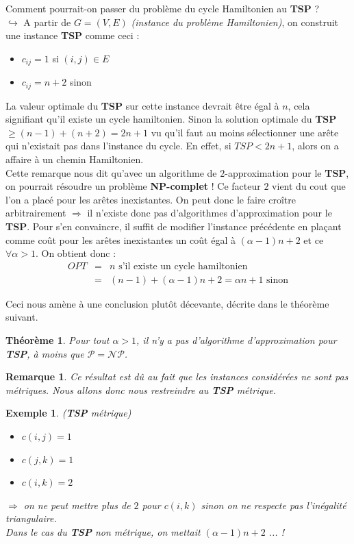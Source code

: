 \documentclass[12pt]{article}
\newcommand{\titre}[1]{\textcolor{title}{#1}}
\newtheorem{exemple}{Exemple}[section]
\newtheorem{rem}{Remarque}[section]
\newtheorem{thm}{Th\'eor\`eme}[section]
\begin{document}
Comment pourrait-on passer du problème du cycle Hamiltonien au \textbf{\titre{TSP}} ? \\
$\hookrightarrow$ A partir de $G=(V,E)$ \textit{(instance du problème Hamiltonien)}, on construit une instance \textbf{\titre{TSP}} comme
ceci :
\begin{itemize}
\item $c_{ij} = 1$ si $(i,j)\in E$
\item $c_{ij} = n+2$ sinon
\end{itemize}
La valeur optimale du \textbf{\titre{TSP}} sur cette instance devrait être égal à $n$, cela signifiant qu'il existe un cycle hamiltonien.
Sinon la solution optimale du \textbf{\titre{TSP}} $\geq (n-1)+(n+2) = 2n+1$ vu qu'il faut au moins sélectionner une arête qui n'existait
pas dans l'instance du cycle. En effet, si $TSP < 2n+1$, alors on a affaire à un
chemin Hamiltonien. \\

Cette remarque nous dit qu'avec un algorithme de $2$-approximation pour le \textbf{\titre{TSP}}, on pourrait résoudre un problème
\textbf{NP-complet} ! Ce facteur $2$ vient du cout que l'on a placé pour les arêtes inexistantes. On peut donc le faire croître
arbitrairement $\Rightarrow$ il n'existe donc pas d'algorithmes d'approximation pour le \textbf{\titre{TSP}}. Pour s'en convaincre, il
suffit de modifier l'instance précédente en plaçant comme coût pour les arêtes inexistantes un coût égal à $(\alpha-1)n+2$ et ce $\forall
\alpha>1$. On obtient donc :
\begin{eqnarray}
\nonumber OPT & = & n \text{ s'il existe un cycle hamiltonien} \\
\nonumber & = & (n-1) + (\alpha-1)n+2 = \alpha n +1 \text{ sinon}
\end{eqnarray}

Ceci nous amène à une conclusion plutôt décevante, décrite dans le théorème suivant.

\begin{thm}
Pour tout $\alpha > 1$, il n'y a pas d'algorithme d'approximation pour \textbf{\titre{TSP}}, à moins que $\mathcal{P=NP}$.
\end{thm}

\begin{rem}
Ce résultat est dû au fait que les instances considérées ne sont pas métriques. Nous allons donc nous restreindre au \textbf{\titre{TSP}}
métrique.
\end{rem}

\begin{exemple}(\textbf{\titre{TSP}} métrique)
\begin{itemize}
\item $c(i,j) = 1$
\item $c(j,k) = 1$
\item $c(i,k) = 2$
\end{itemize}
$\Rightarrow$ on ne peut mettre plus de $2$ pour $c(i,k)$ sinon on ne respecte pas l'inégalité triangulaire.\\
Dans le cas du \textbf{\titre{TSP}} non métrique, on mettait $(\alpha-1)n+2$ ... !
\end{exemple}
\end{document}
